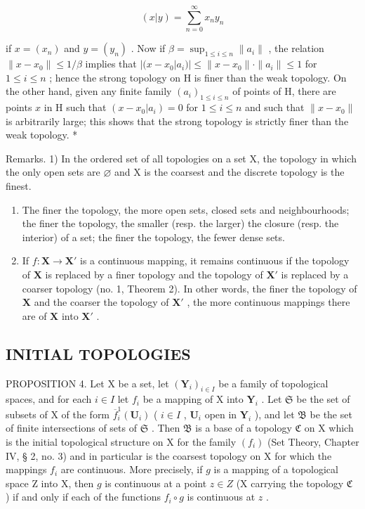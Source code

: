 \[
(x | y) = \sum_ {n = 0} ^ {\infty} x _ {n} y _ {n}
\]

if \(x = (x_n)\) and \(y = (y_n)\) . Now if \(\beta = \sup_{1 \leqslant i \leqslant n} \|a_i\|\) , the relation \(\|x - x_0\| \leqslant 1/\beta\) implies that \(|(x - x_0|a_i)| \leqslant \|x - x_0\| \cdot \|a_i\| \leqslant 1\) for \(1 \leqslant i \leqslant n\) ; hence the strong topology on H is finer than the weak topology. On the other hand, given any finite family \((a_i)_{1 \leqslant i \leqslant n}\) of points of H, there are points \(x\) in H such that \((x - x_0|a_i) = 0\) for \(1 \leqslant i \leqslant n\) and such that \(\|x - x_0\|\) is arbitrarily large; this shows that the strong topology is strictly finer than the weak topology. *

Remarks. 1) In the ordered set of all topologies on a set X, the topology in which the only open sets are \(\varnothing\) and X is the coarsest and the discrete topology is the finest.

\begin{enumerate}
\def\labelenumi{\arabic{enumi})}
\setcounter{enumi}{1}
\item
  The finer the topology, the more open sets, closed sets and neighbourhoods; the finer the topology, the smaller (resp. the larger) the closure (resp. the interior) of a set; the finer the topology, the fewer dense sets.
\item
  If \(f: \mathbf{X} \to \mathbf{X}'\) is a continuous mapping, it remains continuous if the topology of \(\mathbf{X}\) is replaced by a finer topology and the topology of \(\mathbf{X}'\) is replaced by a coarser topology (no. 1, Theorem 2). In other words, the finer the topology of \(\mathbf{X}\) and the coarser the topology of \(\mathbf{X}'\) , the more continuous mappings there are of \(\mathbf{X}\) into \(\mathbf{X}'\) .
\end{enumerate}

\subsection{INITIAL TOPOLOGIES}

PROPOSITION 4. Let X be a set, let \((\mathbf{Y}_i)_{i \in I}\) be a family of topological spaces, and for each \(i \in I\) let \(f_i\) be a mapping of X into \(\mathbf{Y}_i\) . Let \(\mathfrak{S}\) be the set of subsets of X of the form \(\overline{f}_i^1 (\mathbf{U}_i)\) ( \(i \in I\) , \(\mathbf{U}_i\) open in \(\mathbf{Y}_i\) ), and let \(\mathfrak{B}\) be the set of finite intersections of sets of \(\mathfrak{S}\) . Then \(\mathfrak{B}\) is a base of a topology \(\mathfrak{C}\) on X which is the initial topological structure on X for the family \((f_i)\) (Set Theory, Chapter IV, § 2, no. 3) and in particular is the coarsest topology on X for which the mappings \(f_i\) are continuous. More precisely, if \(g\) is a mapping of a topological space Z into X, then \(g\) is continuous at a point \(z \in Z\) (X carrying the topology \(\mathfrak{C}\) ) if and only if each of the functions \(f_i \circ g\) is continuous at \(z\) .

